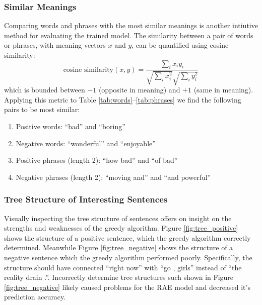 \documentclass{article}
\begin{document}
\subsubsection{Similar Meanings}
Comparing words and phrases with the most similar meanings is another intiutive method for evaluating the trained model. The similarity between a pair of words or phrases, with meaning vectors $x$ and $y$, can be quantified using cosine similarity:
\begin{equation}
    \textrm{cosine similarity} (x, y) = \frac{\sum_i x_i y_i}{\sqrt{\sum_i x_i^2} \sqrt{\sum_i y_i^2}}
\end{equation}
which is bounded between $-1$ (opposite in meaning) and $+1$ (same in meaning). Applying this metric to Table \ref{tab:words}--\ref{tab:phrases} we find the following pairs to be most similar:
\begin{enumerate}
    \item Positive words: ``bad'' and ``boring''
    \item Negative words: ``wonderful'' and ``enjoyable''
    \item Positive phrases (length 2): ``how bad'' and ``of bad''
    \item Negative phrases (length 2): ``moving and'' and ``and powerful''
\end{enumerate}


\subsubsection{Tree Structure of Interesting Sentences}
Visually inspecting the tree structure of sentences offers on insight on the strengths and weaknesses of the greedy algorithm. Figure \ref{fig:tree_positive} shows the structure of a positive sentence, which the greedy algorithm correctly determined. Meanwhile Figure \ref{fig:tree_negative} shows the structure of a negative sentence which the greedy algorithm performed poorly. Specifically, the structure should have connected ``right now'' with ``go , girls'' instead of ``the reality drain .''. Incorrectly determine tree structures such shown in Figure \ref{fig:tree_negative} likely caused problems for the RAE model and decreased it's prediction accuracy.
\end{document}
